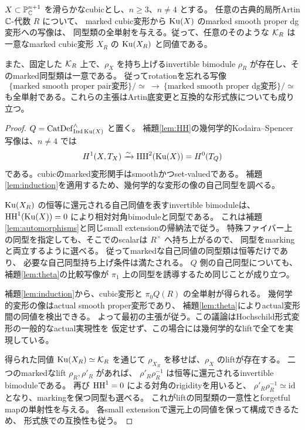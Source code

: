 \begin{theorem}[rotationを忘れた形式復元]\label{thm:unpolarized-formal}
 \(X\subset\mathbb P^{n+1}_{\mathbb C}\) を滑らかなcubicとし、\(n\ge3\)、\(n\ne4\) とする。
 任意の古典的局所Artin \(\mathbb C\)-代数 \(R\) について、
 marked cubic変形から \(\operatorname{Ku}(X)\) のmarked smooth proper dg変形への写像は、
 同型類の全単射を与える。従って、任意のそのような \(\mathcal K_R\) は
 一意なmarked cubic変形 \(X_R\) の \(\operatorname{Ku}(X_R)\) と同値である。

 また、固定した \(\mathcal K_R\) 上で、\(\rho_X\) を持ち上げるinvertible bimodule
 \(\rho_R\) が存在し、そのmarked同型類は一意である。
 従ってrotationを忘れる写像
 \[
  \{\text{marked smooth proper pair変形}\}/\simeq
  \ \longrightarrow\
  \{\text{marked smooth proper dg変形}\}/\simeq
 \]
 も全単射である。これらの主張はArtin底変更と互換的な形式族についても成り立つ。
\end{theorem}
\begin{proof}
 \(Q=\operatorname{CatDef}_{\operatorname{Ind}\operatorname{Ku}(X)}^{\wedge}\) と置く。
 補題\ref{lem:HH}の幾何学的Kodaira--Spencer写像は、\(n\ne4\) では
 \[
  H^1(X,T_X)\xrightarrow{\sim}
  \operatorname{HH}^2(\operatorname{Ku}(X))=H^0(T_Q)
 \]
 である。cubicのmarked変形関手はsmoothかつset-valuedである。
 補題\ref{lem:induction}を適用するため、幾何学的な変形の像の自己同型を調べる。

 \(\operatorname{Ku}(X_R)\) の恒等に還元される自己同値を表すinvertible bimoduleは、
 \(\operatorname{HH}^1(\operatorname{Ku}(X))=0\) により相対対角bimoduleと同型である。
 これは補題\ref{lem:automorphisms}と同じsmall extensionの帰納法で従う。
 特殊ファイバー上の同型を指定しても、そこでのscalarは \(R^\times\) へ持ち上がるので、
 同型をmarkingと両立するように選べる。
 従ってmarkedな自己同値の同型類は恒等だけであり、
 必要な自己同型持ち上げ条件は満たされる。
 \(Q\) 側の自己同型についても、補題\ref{lem:theta}の比較写像が
 \(\pi_1\) 上の同型を誘導するため同じことが成り立つ。

 補題\ref{lem:induction}から、cubic変形と \(\pi_0Q(R)\) の全単射が得られる。
 幾何学的変形の像はactual smooth proper変形であり、
 補題\ref{lem:theta}によりactual変形間の同値を検出できる。
 よって最初の主張が従う。この議論はHochschild形式変形の一般的なactual実現性を
 仮定せず、この場合には幾何学的なliftで全てを実現している。

 得られた同値 \(\operatorname{Ku}(X_R)\simeq\mathcal K_R\) を通じて
 \(\rho_{X_R}\) を移せば、\(\rho_X\) のliftが存在する。
 二つのmarkedなlift \(\rho_R,\rho'_R\) があれば、
 \(\rho'_R\rho_R^{-1}\) は恒等に還元されるinvertible bimoduleである。
 再び \(\operatorname{HH}^1=0\) による対角のrigidityを用いると、
 \(\rho'_R\rho_R^{-1}\simeq\mathrm{id}\) となり、markingを保つ同型も選べる。
 これがliftの同型類の一意性とforgetful mapの単射性を与える。
 各small extensionで還元上の同値を保って構成できるため、
 形式族での互換性も従う。
\end{proof}

